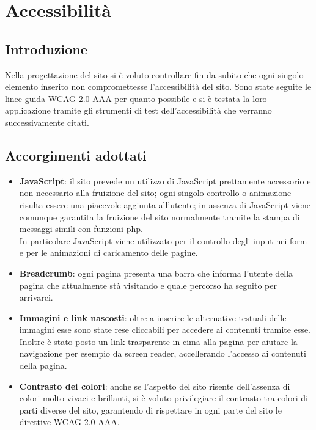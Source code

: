 \documentclass[a4paper,12pt]{article}
\begin{document}
\section{Accessibilità}
\subsection{Introduzione}
Nella progettazione del sito si è voluto controllare fin da subito che ogni singolo elemento inserito non compromettesse l'accessibilità del sito. Sono state seguite le linee guida WCAG 2.0 AAA per quanto possibile e si è testata la loro applicazione tramite gli strumenti di test dell'accessibilità che verranno successivamente citati.
\subsection{Accorgimenti adottati}
\begin{itemize}
	\item \textbf{JavaScript}: il sito prevede un utilizzo di JavaScript prettamente accessorio e non necessario alla fruizione del sito; ogni singolo controllo o animazione risulta essere una piacevole aggiunta all'utente; in assenza di JavaScript viene comunque garantita la fruizione del sito normalmente tramite la stampa di messaggi simili con funzioni php.\\
	In particolare JavaScript viene utilizzato per il controllo degli input nei form e per le animazioni di caricamento delle pagine.
	
	\item \textbf{Breadcrumb}: ogni pagina presenta una barra che informa l'utente della pagina che attualmente stà visitando e quale percorso ha seguito per arrivarci.
	
	\item \textbf{Immagini e link nascosti}: oltre a inserire le alternative testuali delle immagini esse sono state rese cliccabili per accedere ai contenuti tramite esse.\\
	Inoltre è stato posto un link trasparente in cima alla pagina per aiutare la navigazione per esempio da screen reader, accellerando l'accesso ai contenuti della pagina.
	
	\item \textbf{Contrasto dei colori}: anche se l'aspetto del sito risente dell'assenza di colori molto vivaci e brillanti, si è voluto privilegiare il contrasto tra colori di parti diverse del sito, garantendo di rispettare in ogni parte del sito le direttive WCAG 2.0 AAA.
\end{itemize}
\end{document}
